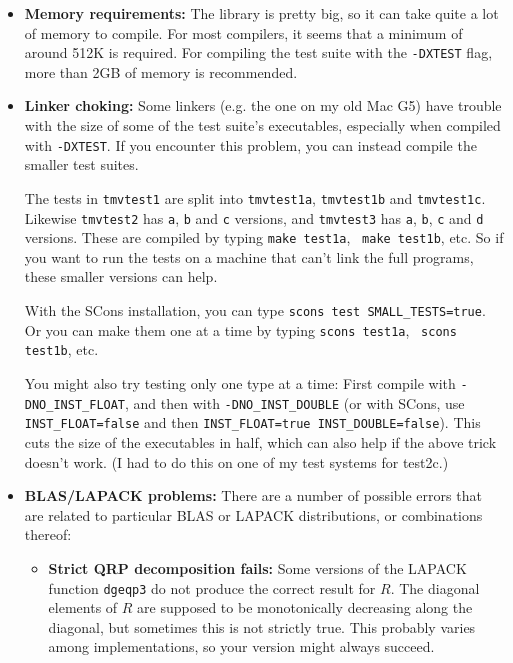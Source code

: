 \documentclass[twoside,letterpaper,11pt]{article}
\renewcommand{\tt}[1]{{\lstinline {#1}}}
\begin{document}
\begin{itemize}
\item {\bf Memory requirements:}
The library is pretty big, so it can take quite a lot of memory to compile. 
For most compilers, it seems that a minimum of around 512K is required.
For compiling the test suite with the \texttt{-DXTEST} flag, more than 
2GB of memory is recommended.

\item {\bf Linker choking:}
Some linkers (e.g. the one on my old Mac G5) have trouble with the size 
of some of the test suite's executables, especially when compiled 
with \texttt{-DXTEST}.  If you encounter this problem, you can instead
compile the smaller test suites.  

The tests
in \texttt{tmvtest1} are split into \texttt{tmvtest1a}, \texttt{tmvtest1b} and \texttt{tmvtest1c}.
Likewise \texttt{tmvtest2} has \texttt{a}, \texttt{b} and \texttt{c} versions, and \texttt{tmvtest3}
has \texttt{a}, \texttt{b}, \texttt{c} and \texttt{d} versions.  These are 
compiled by typing \texttt{make test1a},~ \texttt{make test1b}, etc.  So if you want
to run the tests on a machine that can't link the full programs, these
smaller versions can help.   

With the SCons installation, you can 
type \texttt{scons test SMALL\_TESTS=true}.  Or you can make them one
at a time by typing \texttt{scons test1a},~ \texttt{scons test1b}, etc.

You might also try testing only one type at a time: First compile with \texttt{-DNO\_INST\_FLOAT},
and then with \texttt{-DNO\_INST\_DOUBLE} (or with SCons, use \texttt{INST\_FLOAT=false}
and then \texttt{INST\_FLOAT=true INST\_DOUBLE=false}).  This cuts the size of the executables
in half, which can also help if the above trick doesn't work.  (I had to do this on one 
of my test systems for test2c.)


\item{\bf BLAS/LAPACK problems:}
There are a number of possible errors that are related to particular BLAS or LAPACK
distributions, or combinations thereof:
\begin{itemize}
\item{\bf Strict QRP decomposition fails:}
Some versions of the LAPACK function \tt{dgeqp3} do not produce the correct
result for $R$.  The diagonal elements of $R$ are supposed to be monotonically decreasing
along the diagonal, but sometimes this is not strictly true.  This probably varies among
implementations, so your version might always succeed.


\end{itemize}
\end{itemize}
\end{document}
